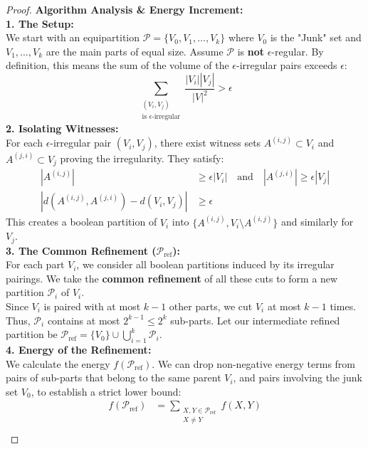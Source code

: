 \documentclass[a4paper]{article}
\begin{document}
\begin{proof}
    \vspace{0.5cm}
    \noindent \textbf{Algorithm Analysis \& Energy Increment:} \\
    \textbf{1. The Setup:} \\
    We start with an equipartition $\mathcal{P} = \{V_0, V_1, \dots, V_k\}$ where $V_0$ is the "Junk" set and $V_1, \dots, V_k$ are the main parts of equal size. Assume $\mathcal{P}$ is \textbf{not} $\epsilon$-regular. By definition, this means the sum of the volume of the $\epsilon$-irregular pairs exceeds $\epsilon$:
    \[
        \sum_{\substack{(V_i, V_j) \\ \text{is } \epsilon\text{-irregular}}} \frac{|V_i||V_j|}{|V|^2} > \epsilon
    \]
    \textbf{2. Isolating Witnesses:} \\
    For each $\epsilon$-irregular pair $(V_i, V_j)$, there exist witness sets $A^{(i,j)} \subset V_i$ and $A^{(j,i)} \subset V_j$ proving the irregularity. They satisfy:
    \begin{align*}
        |A^{(i,j)}| &\ge \epsilon |V_i| \quad \text{and} \quad |A^{(j,i)}| \ge \epsilon |V_j| \\
        |d(A^{(i,j)}, A^{(j,i)}) - d(V_i, V_j)| &\ge \epsilon
    \end{align*}
    This creates a boolean partition of $V_i$ into $\{A^{(i,j)}, V_i \setminus A^{(i,j)}\}$ and similarly for $V_j$. \\
    \textbf{3. The Common Refinement ($\mathcal{P}_{\text{ref}}$):} \\
    For each part $V_i$, we consider all boolean partitions induced by its irregular pairings. We take the \textbf{common refinement} of all these cuts to form a new partition $\mathcal{P}_i$ of $V_i$. \\
    Since $V_i$ is paired with at most $k-1$ other parts, we cut $V_i$ at most $k-1$ times. Thus, $\mathcal{P}_i$ contains at most $2^{k-1} \le 2^k$ sub-parts. Let our intermediate refined partition be $\mathcal{P}_{\text{ref}} = \{V_0\} \cup \bigcup_{i=1}^k \mathcal{P}_i$. \\
    \textbf{4. Energy of the Refinement:} \\
    We calculate the energy $f(\mathcal{P}_{\text{ref}})$. We can drop non-negative energy terms from pairs of sub-parts that belong to the same parent $V_i$, and pairs involving the junk set $V_0$, to establish a strict lower bound:
    \begin{align*}
        f(\mathcal{P}_{\text{ref}}) &= \sum_{\substack{X, Y \in \mathcal{P}_{\text{ref}} \\ X \neq Y}} f(X, Y) \\

\end{align*}
\end{proof}
\end{document}

